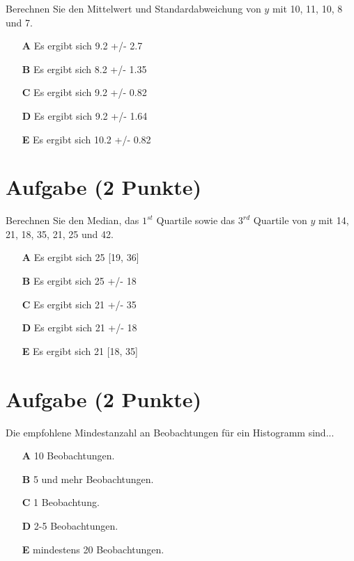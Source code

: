 \documentclass[a4paper, 9pt]{scrartcl}\usepackage[]{graphicx}\usepackage[]{xcolor}
\begin{document}
Berechnen Sie den Mittelwert und Standardabweichung von $y$ mit 10, 11, 10, 8 und 7.



\begin{enumerate}
\item [\textbf{A} \msquare] Es ergibt sich 9.2 +/- 2.7
\item [\textbf{B} \msquare] Es ergibt sich 8.2 +/- 1.35
\item [\textbf{C} \msquare] Es ergibt sich 9.2 +/- 0.82
\item [\textbf{D} \msquare] Es ergibt sich 9.2 +/- 1.64
\item [\textbf{E} \msquare] Es ergibt sich 10.2 +/- 0.82
\end{enumerate} 

\section{Aufgabe \hfill (2 Punkte)}




Berechnen Sie den Median, das $1^{st}$ Quartile sowie das $3^{rd}$ Quartile von $y$ mit 14, 21, 18, 35, 21, 25 und 42.



\begin{enumerate}
\item [\textbf{A} \msquare] Es ergibt sich 25 [19, 36]
\item [\textbf{B} \msquare] Es ergibt sich 25 +/- 18
\item [\textbf{C} \msquare] Es ergibt sich 21 +/- 35
\item [\textbf{D} \msquare] Es ergibt sich 21 +/- 18
\item [\textbf{E} \msquare] Es ergibt sich 21 [18, 35]
\end{enumerate} 

\section{Aufgabe \hfill (2 Punkte)}



Die empfohlene Mindestanzahl an Beobachtungen f{\"u}r ein Histogramm sind...



\begin{enumerate}
\item [\textbf{A} \msquare] 10 Beobachtungen.
\item [\textbf{B} \msquare] 5 und mehr Beobachtungen.
\item [\textbf{C} \msquare] 1 Beobachtung.
\item [\textbf{D} \msquare] 2-5 Beobachtungen.
\item [\textbf{E} \msquare] mindestens 20 Beobachtungen.
\end{enumerate}
\end{document}
